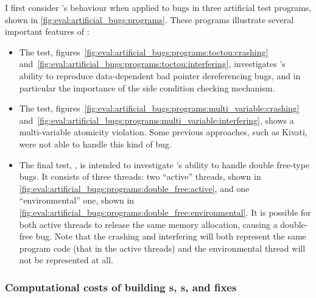 \noindent
I first consider {\technique}'s behaviour when applied to bugs in
three artificial test programs, shown in
\autoref{fig:eval:artificial_bugs:programs}.  These programs
illustrate several important features of {\technique}:

\begin{itemize}
  \item The  test,
    figures~\ref{fig:eval:artificial_bugs:programs:toctou:crashing}
    and~\ref{fig:eval:artificial_bugs:programs:toctou:interfering},
    investigates {\technique}'s ability to reproduce data-dependent
    bad pointer dereferencing bugs, and in particular the importance
    of the side condition checking mechanism.
  \item The  test,
    figures~\ref{fig:eval:artificial_bugs:programs:multi_variable:crashing}
    and~\ref{fig:eval:artificial_bugs:programs:multi_variable:interfering},
    shows a multi-variable atomicity violation.  Some previous
    approaches, such as Kivati\needCite{}, were not able to handle
    this kind of bug.
  \item {} The final test, , is intended
    to investigate {\technique}'s ability to handle double free-type
    bugs.  It consists of three threads: two ``active'' threads, shown
    in \autoref{fig:eval:artificial_bugs:programs:double_free:active},
    and one ``environmental'' one, shown in
    \autoref{fig:eval:artificial_bugs:programs:double_free:environmental}.
    It is possible for both active threads to release the same memory
    allocation, causing a double-free bug.  Note that the crashing and
    interfering {\StateMachines} will both represent the same program
    code (that in the active threads) and the environmental thread
    will not be represented at all.
\end{itemize}

\subsubsection{Computational costs of building s, s, and fixes}

